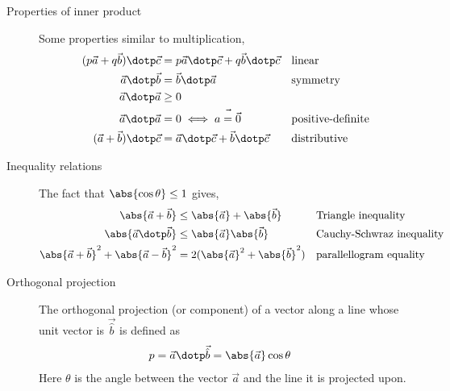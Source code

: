 \begin{description}
    \item[Properties of inner product] Some properties similar to multiplication,
          \begin{align}
              (p\vec{a} + q\vec{b}) \dotp \vec{c} & = p \vec{a} \dotp \vec{c}
              + q \vec{b} \dotp \vec{c}           &
                                                  & \text{linear}                \\
              \vec{a} \dotp \vec{b}               & = \vec{b} \dotp \vec{a}    &
                                                  & \text{symmetry}              \\
              \vec{a} \dotp \vec{a}               & \geq 0                       \\
              \vec{a} \dotp \vec{a}               & = 0 \iff \vec{a = \vec{0}} &
                                                  & \text{positive-definite}     \\
              (\vec{a} + \vec{b}) \dotp \vec{c}   & = \vec{a} \dotp \vec{c}
              + \vec{b} \dotp \vec{c}             &
                                                  & \text{distributive}
          \end{align}

    \item[Inequality relations] The fact that $ \abs{\cos\theta} \leq 1$ gives,
          \begin{align}
              \abs{\vec{a} + \vec{b}}                               &
              \leq \abs{\vec{a}} + \abs{\vec{b}}                    &
                                                                    &
              \text{Triangle inequality}                              \\
              \abs{\vec{a} \dotp \vec{b}}                           &
              \leq \abs{\vec{a}} \abs{\vec{b}}                      &
                                                                    &
              \text{Cauchy-Schwraz inequality}                        \\
              \abs{\vec{a} + \vec{b}}^2 + \abs{\vec{a} - \vec{b}}^2 &
              = 2 (\abs{\vec{a}}^2 + \abs{\vec{b}}^2)               &
                                                                    &
              \text{parallellogram equality}
          \end{align}

    \item[Orthogonal projection] The orthogonal projection (or component) of a vector
          along a line whose unit vector is $ \vec{\hat{b}} $ is defined as
          \begin{align}
              p & = \vec{a} \dotp \vec{\hat{b}} = \abs{\vec{a}} \cos \theta
          \end{align}
          Here $ \theta $ is the angle between the vector $ \vec{a} $ and the line it is
          projected upon. \par


\end{description}
